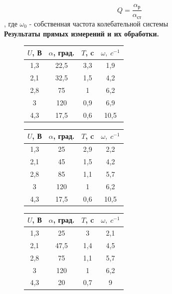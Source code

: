 \documentclass[a4paper]{article}
\begin{document}
\begin{equation}
	Q = \frac{\alpha_\text{р}}{\alpha_\text{ст}}
\end{equation}
, где $ \omega_0$ - собственная частота колебательной системы\\

{\parindent=0pt\textbf{Результаты прямых измерений и их обработки.}}\\

\begin{figure}[htb]
	\begin{minipage}[b]{0.3\textwidth}
			\begin{tabular}{|c|c|c|c|}
				\hline
				$U$, В&$\alpha$, град.& $T$, c& $\omega,\;c^{-1}$  \\
				\hline
				1,3&  22,5&   3,3&1,9\\
				
				2,1& 32,5 &1,5   &4,2\\
				
				2,8& 75 &  1 &6,2\\
				
				3& 120 &  0,9 &6,9\\
				
				4,3& 17,5 &  0,6 &10,5\\
				\hline
			\end{tabular}
	\end{minipage}
\hfill
	\begin{minipage}[b]{0.3\textwidth}
		\begin{tabular}{|c|c|c|c|}
			\hline
			$U$, В&$\alpha$, град.& $T$, c& $\omega,\;c^{-1}$  \\
			\hline
			1,3&  25&   2,9&2,2\\
			
			2,1& 45&1,5   &4,2\\
			
			2,8& 85 &  1,1 &5,7\\
			
			3& 120 &  1 &6,2\\
			
			4,3& 17,5 &  0,6 &10,5\\
			\hline
		\end{tabular}
\end{minipage}
\hfill
	\begin{minipage}[b]{0.3\textwidth}
		\begin{tabular}{|c|c|c|c|}
			\hline
			$U$, В&$\alpha$, град.& $T$, c& $\omega,\;c^{-1}$  \\
			\hline
			1,3&  25&   3&2,1\\
			
			2,1& 47,5 &1,4   &4,5\\
			
			2,8& 75 &  1,1 &5,7\\
			
			3& 120 &  1 &6,2\\
			
			4,3& 20 &  0,7 &9\\
			\hline
		\end{tabular}
\end{minipage}
\end{figure}
\end{document}
